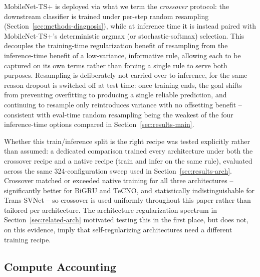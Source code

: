 \documentclass[preprint,12pt]{elsarticle}
\begin{document}
MobileNet-TS+ is deployed via what we term the \emph{crossover} protocol: the downstream classifier is trained under per-step random resampling (Section~\ref{sec:methods-diagnosis}), while at inference time it is instead paired with MobileNet-TS+'s deterministic argmax (or stochastic-softmax) selection. This decouples the training-time regularization benefit of resampling from the inference-time benefit of a low-variance, informative rule, allowing each to be captured on its own terms rather than forcing a single rule to serve both purposes. Resampling is deliberately not carried over to inference, for the same reason dropout is switched off at test time: once training ends, the goal shifts from preventing overfitting to producing a single reliable prediction, and continuing to resample only reintroduces variance with no offsetting benefit -- consistent with eval-time random resampling being the weakest of the four inference-time options compared in Section~\ref{sec:results-main}.

Whether this train/inference split is the right recipe was tested explicitly rather than assumed: a dedicated comparison trained every architecture under both the crossover recipe and a native recipe (train and infer on the same rule), evaluated across the same 324-configuration sweep used in Section~\ref{sec:results-arch}. Crossover matched or exceeded native training for all three architectures -- significantly better for BiGRU and TeCNO, and statistically indistinguishable for Trans-SVNet -- so crossover is used uniformly throughout this paper rather than tailored per architecture. The architecture-regularization spectrum in Section~\ref{sec:related-arch} motivated testing this in the first place, but does not, on this evidence, imply that self-regularizing architectures need a different training recipe.

\subsection{Compute Accounting}
\label{sec:methods-flops}
\end{document}

